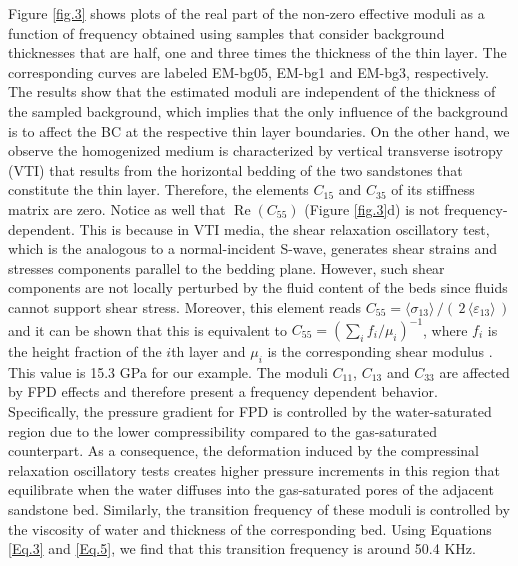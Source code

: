 \documentclass[draft]{agujournal2019}
\renewcommand{\Re}{\operatorname{Re} }
\begin{document}
Figure \ref{fig.3} shows plots of the real part of the non-zero effective moduli as a function of frequency obtained using samples that consider background thicknesses that are half, one and three times the thickness of the thin layer. The corresponding curves are labeled EM-bg05, EM-bg1 and EM-bg3, respectively. The results show that the estimated moduli are independent of the thickness of the sampled background, which implies that the only influence of the background is to affect the BC at the respective thin layer boundaries. 
On the other hand, we observe the homogenized medium is
characterized by vertical transverse isotropy (VTI) that results from the horizontal bedding of the two sandstones that constitute the thin layer. Therefore, the elements $C_{15}$ and $C_{35}$ of its stiffness matrix are zero. Notice as well that $\Re(C_{55})$  (Figure \ref{fig.3}d) is not frequency-dependent. This is because in VTI media, the shear relaxation oscillatory test, which is the analogous to a normal-incident S-wave, generates shear strains and stresses components  parallel to the bedding plane. However, such shear components are not locally perturbed by the fluid content of the beds since fluids cannot support shear stress. Moreover, this element reads $C_{55} = \langle \sigma_{13}\rangle\,/(\,2\, \langle \varepsilon_{13} \rangle\,)$ and it can be shown that this is equivalent to $C_{55}  =\left( \sum_i f_i/\mu_i \right)^{-1}$, where $f_i$ is the height fraction of the $i$th layer and $\mu_i$ is the corresponding shear modulus \cite{Backus1962, Salamon1968}. This value is 15.3 GPa for our example. The moduli  $C_{11}$, $C_{13}$ and $C_{33}$ are affected by FPD effects and therefore present a frequency dependent behavior. Specifically, the pressure gradient for FPD is controlled by the water-saturated region due to the lower compressibility compared to the gas-saturated counterpart. As a consequence, the deformation induced by the compressinal relaxation oscillatory tests creates  higher pressure increments in this region that equilibrate when the water diffuses into the gas-saturated pores of the adjacent sandstone bed. Similarly, the transition frequency of these moduli is controlled by the viscosity of water and thickness of the corresponding bed. Using Equations \eqref{Eq.3} and \eqref{Eq.5}, we find that this transition frequency is around 50.4 KHz. 
\end{document}
